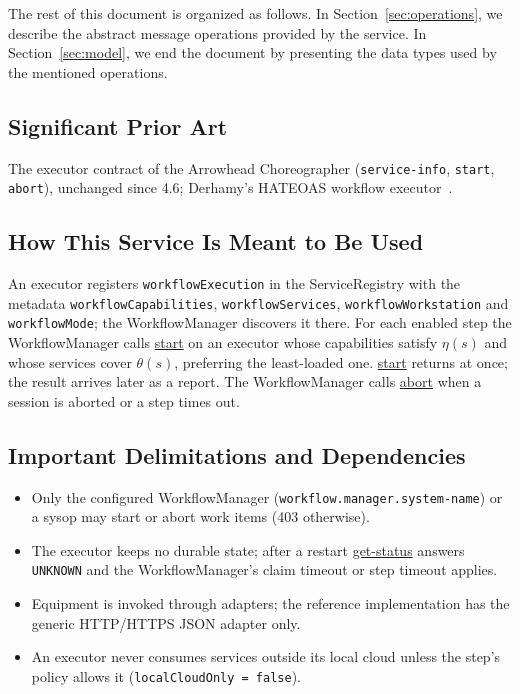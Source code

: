 \documentclass[a4paper]{arrowhead}
\newcommand{\oref}[1]{{\textcolor{ArrowheadBlue}{\hyperref[sec:operations:#1]{#1}}}}
\begin{document}
The rest of this document is organized as follows.
In Section~\ref{sec:operations}, we describe the abstract message operations provided by the service.
In Section~\ref{sec:model}, we end the document by presenting the data types used by the mentioned operations.

\subsection{Significant Prior Art}
The executor contract of the Arrowhead Choreographer (\texttt{service-info}, \texttt{start},
\texttt{abort}), unchanged since 4.6; Derhamy's HATEOAS workflow executor~\cite{derhamy2018workflow}.

\subsection{How This Service Is Meant to Be Used}
An executor registers \texttt{workflowExecution} in the ServiceRegistry with the metadata
\texttt{workflowCapabilities}, \texttt{workflowServices}, \texttt{workflowWorkstation} and \texttt{workflowMode}; the
WorkflowManager discovers it there. For each enabled step the WorkflowManager calls \oref{start} on an executor whose
capabilities satisfy $\eta(s)$ and whose services cover $\theta(s)$, preferring the least-loaded one. \oref{start}
returns at once; the result arrives later as a report. The WorkflowManager calls \oref{abort} when a session is
aborted or a step times out.

\subsection{Important Delimitations and Dependencies}
\label{sec:delimitations}
\begin{itemize}
\item Only the configured WorkflowManager (\texttt{workflow.manager.system-name}) or a sysop may start or abort work items (403 otherwise).
\item The executor keeps no durable state; after a restart \oref{get-status} answers \texttt{UNKNOWN} and the WorkflowManager's claim timeout or step timeout applies.
\item Equipment is invoked through adapters; the reference implementation has the generic HTTP/HTTPS JSON adapter only.
\item An executor never consumes services outside its local cloud unless the step's policy allows it (\texttt{localCloudOnly = false}).
\end{itemize}
\end{document}
